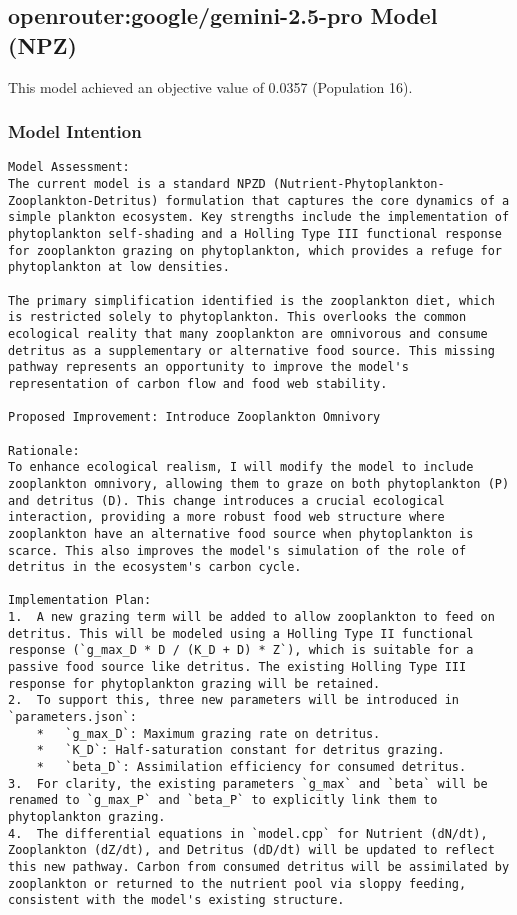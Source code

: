 \subsection{openrouter:google/gemini-2.5-pro Model (NPZ)}
This model achieved an objective value of 0.0357 (Population 16).

\subsubsection{Model Intention}
\begin{lstlisting}
Model Assessment:
The current model is a standard NPZD (Nutrient-Phytoplankton-Zooplankton-Detritus) formulation that captures the core dynamics of a simple plankton ecosystem. Key strengths include the implementation of phytoplankton self-shading and a Holling Type III functional response for zooplankton grazing on phytoplankton, which provides a refuge for phytoplankton at low densities.

The primary simplification identified is the zooplankton diet, which is restricted solely to phytoplankton. This overlooks the common ecological reality that many zooplankton are omnivorous and consume detritus as a supplementary or alternative food source. This missing pathway represents an opportunity to improve the model's representation of carbon flow and food web stability.

Proposed Improvement: Introduce Zooplankton Omnivory

Rationale:
To enhance ecological realism, I will modify the model to include zooplankton omnivory, allowing them to graze on both phytoplankton (P) and detritus (D). This change introduces a crucial ecological interaction, providing a more robust food web structure where zooplankton have an alternative food source when phytoplankton is scarce. This also improves the model's simulation of the role of detritus in the ecosystem's carbon cycle.

Implementation Plan:
1.  A new grazing term will be added to allow zooplankton to feed on detritus. This will be modeled using a Holling Type II functional response (`g_max_D * D / (K_D + D) * Z`), which is suitable for a passive food source like detritus. The existing Holling Type III response for phytoplankton grazing will be retained.
2.  To support this, three new parameters will be introduced in `parameters.json`:
    *   `g_max_D`: Maximum grazing rate on detritus.
    *   `K_D`: Half-saturation constant for detritus grazing.
    *   `beta_D`: Assimilation efficiency for consumed detritus.
3.  For clarity, the existing parameters `g_max` and `beta` will be renamed to `g_max_P` and `beta_P` to explicitly link them to phytoplankton grazing.
4.  The differential equations in `model.cpp` for Nutrient (dN/dt), Zooplankton (dZ/dt), and Detritus (dD/dt) will be updated to reflect this new pathway. Carbon from consumed detritus will be assimilated by zooplankton or returned to the nutrient pool via sloppy feeding, consistent with the model's existing structure.
\end{lstlisting}

